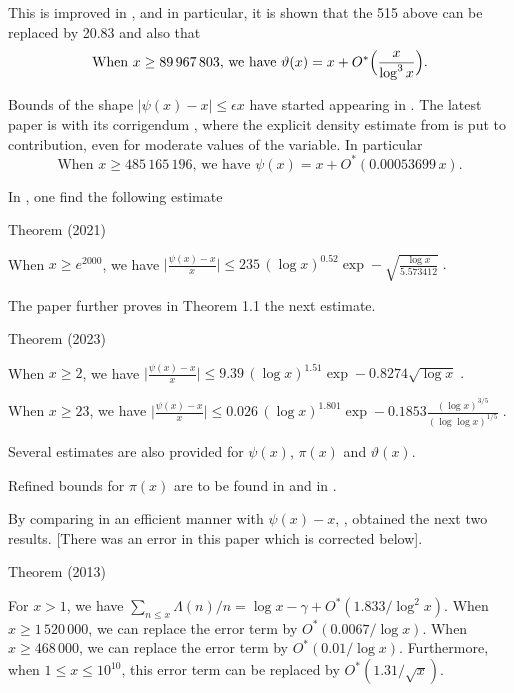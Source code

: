 This is improved in
\cite{Dusart*16},
and in particular, it is shown that the 515 above can be replaced by
20.83 and also that
$$
\text{When $x\ge 89\,967\,803$, we have } \vartheta(x)=x+O^*\Bigl(\frac{x}{\log^3
x}\Bigr).
$$

Bounds of the shape $|\psi(x)-x|\le \epsilon x$ have started appearing
in
\cite{Rosser-Schoenfeld*62}.
The latest paper is
\cite{Kadiri-Faber*13}
with its corrigendum
\cite{Kadiri-Faber*18},
where the explicit density estimate from
\cite{Kadiri*13}
is put to contribution, even for moderate
values of the variable. In particular
$$
\text{When $x\ge 485\,165\,196$, we have } \psi(x)=x+O^*(0.00053699\,x).
$$

In
\cite{Platt-Trudgian*21b},
one find the following estimate
\par 
\begin{thm}{Theorem (2021)}

  When $x\ge e^{2000}$, we have
  $\biggl|\frac{\psi(x)-x}{x}\biggr|\le 235\,(\log
  x)^{0.52}\exp-\sqrt{\frac{\log x}{5.573412}}\;.$


The paper
\cite{Johnston-Yang*23}
further proves in Theorem 1.1 the next estimate.
\par 
Theorem (2023)

  
When $x\ge 2$, we have
  $\biggl|\frac{\psi(x)-x}{x}\biggr|\le 9.39\,(\log
x)^{1.51}\exp-0.8274\sqrt{\log x}\;.$
\par 
  When $x\ge 23$, we have
  $\biggl|\frac{\psi(x)-x}{x}\biggr|\le 0.026\,(\log
x)^{1.801}\exp-0.1853\frac{(\log x)^{3/5}}{(\log\log x)^{1/5}}\;.$


Several estimates are also provided for $\psi(x)$, $\pi(x)$ and $\vartheta(x)$.


Refined bounds for $\pi(x)$ are to be found in
\cite{Panaitopol*00}
and in
\cite{Axler*16}.



By comparing in an efficient manner with $\psi(x)-x$,
\cite{Ramare*12-1},
obtained the next two results. [There was an error in this paper which
is corrected below].

\par 
Theorem (2013)


  For $x > 1$, we have
  $\sum_{n\le x}\Lambda(n)/n=\log x-\gamma+O^*(1.833/\log^2x)$.
  When $x\ge 1\,520\,000$, we can replace the error term by $O^*(0.0067/\log
  x)$. When $x\ge 468\,000$, we can replace the error term by $O^*(0.01/\log
  x)$. 
  Furthermore, when $1\le x\le 10^{10}$, this error term can be
  replaced by $O^*(1.31/\sqrt{x})$. 
\end{thm}


